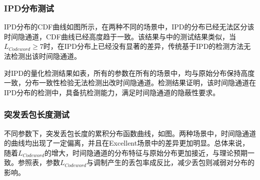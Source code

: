 \subsubsection{IPD分布测试}
\label{chap:zigzag:results:undetectability:ipd}

IPD分布的CDF曲线如图所示，在两种不同的场景中，IPD的分布已经无法区分该时间隐通道，CDF曲线已经高度趋于一致。该结果与中的测试结果类似，当$L_{Codeword}\ge 7$时，在IPD分布上已经没有显著的差异，传统基于IPD的检测方法无法检测出该时间隐通道。


对IPD的量化检测结果如表，所有的参数在所有的场景中，均与原始分布保持高度一致，分布一致性检验无法检测出改时间隐通道。检测结果证明，该时间隐通道在IPD分布的检测中，具备抗检测能力，满足时间隐通道的隐蔽性要求。

\subsubsection{突发丢包长度测试}
\label{chap:zigzag:results:undetectability:burst}

不同参数下，突发丢包长度的累积分布函数曲线，如图。两种场景中，时间隐通道的曲线均出现了一定偏离，并且在Excellent场景中的差异更加明显。总体来说，随着$L_{Codeword}$的增大，时间隐通道的分布特征与原始分布更加接近，与理论预期一致。参照表，参数$L_{Codeword}$与调制产生的丢包率成反比，减少丢包则减弱对分布的影响。


